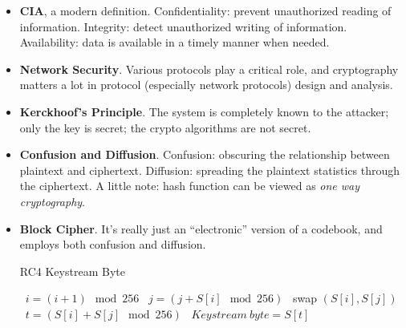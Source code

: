 \documentclass[twocolumn]{article}
\begin{document}
\begin{itemize}
\item \textbf{CIA}, a modern definition. Confidentiality: prevent
  unauthorized reading of information. Integrity: detect unauthorized
  writing of information. Availability: data is available in a timely
  manner when needed. 
\item \textbf{Network Security}. Various protocols play a critical
  role, and cryptography matters a lot in protocol (especially network
  protocols) design and analysis.
\item \textbf{Kerckhoof's Principle}. The system is completely known
  to the attacker; only the key is secret; the crypto algorithms are
  not secret. 
\item \textbf{Confusion and Diffusion}. Confusion: obscuring the
  relationship between plaintext and ciphertext. Diffusion: spreading
  the plaintext statistics through the ciphertext. A little note: hash
  function can be viewed as \emph{one way cryptography}.
\item \textbf{Block Cipher}. It's really just an ``electronic''
  version of a codebook, and employs both confusion and diffusion. 
  \begin{algorithm}
    \caption{RC4 Keystream Byte}
    \label{algo:rc4-keystream-byte}
    \begin{algorithmic}
      \STATE~$i=(i+1)\mod 256$
      \STATE~$j=(j+S[i]\mod 256)$
      \STATE~swap $(S[i], S[j])$
      \STATE~$t=(S[i]+S[j]\mod 256)$
      \STATE~$Keystream~ byte=S[t]$
    \end{algorithmic}
  \end{algorithm}
\end{itemize}
\end{document}
